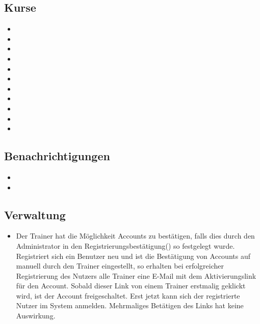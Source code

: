 \documentclass[a4paper]{scrreprt}
\begin{document}
\subsection{Kurse}
\begin{itemize}
	\item {}
	\item {}
	\item {}
	\item {}
	\item {}
	\item {}
	\item {}
	\item {}
	\item {}
	\item {}
	\item {}
\end{itemize}

\subsection{Benachrichtigungen}
\begin{itemize}
	\item {}
	\item {}	
\end{itemize}

\subsection{Verwaltung}
\begin{itemize}
	\item {}
	Der Trainer hat die Möglichkeit Accounts zu bestätigen, falls dies durch den Administrator in den Registrierungsbestätigung() so festgelegt wurde. Registriert sich ein Benutzer neu und ist die Bestätigung von Accounts auf manuell durch den Trainer eingestellt, so erhalten bei erfolgreicher Registrierung des Nutzers alle Trainer eine E-Mail mit dem Aktivierungslink für den Account. Sobald dieser Link von einem Trainer erstmalig geklickt wird, ist der Account freigeschaltet. Erst jetzt kann sich der registrierte Nutzer im System anmelden. Mehrmaliges Betätigen des Links hat keine Auswirkung.
\end{itemize}
\end{document}
